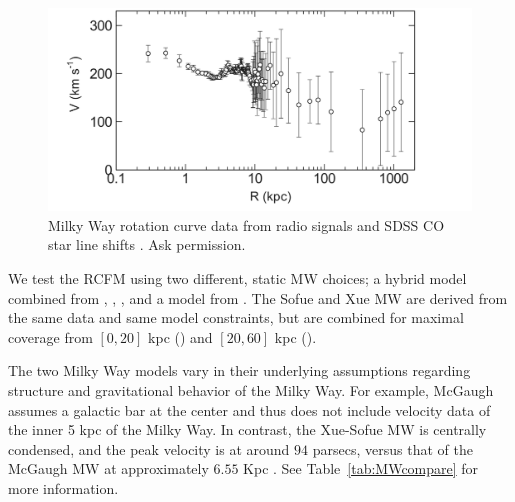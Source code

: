 \documentclass[reprint,%
 amsmath,amssymb,
 aps,
]{revtex4-1}
\begin{document}
 
 \begin{figure}
   \centering
   \includegraphics[width=\linewidth]{Sofue_MWtoLGData}
   \caption{ Milky Way rotation curve data from radio signals and SDSS CO star line shifts  \cite{Sof11}. Ask permission.}
  \label{fig:mwSofue}
\end{figure}

 We test the RCFM   using two different, static MW choices; 
   a hybrid model combined from  \citet{Xue}, 
  \citet{Sofue}, \cite{sofue2009unified}, and 
  a model from  \citet{McGaugh_2019}. The Sofue and Xue MW are derived from the same data and same model constraints, but are combined for maximal coverage from  $[0,20]$ kpc
  (\citet{Sofue})   and  $[20,60]$ kpc  (\citet{Xue}). 
  
   The  two Milky Way models vary in their underlying assumptions regarding structure and gravitational behavior of the Milky Way. For example, McGaugh \cite{McGaugh_2019} assumes a galactic bar at the center and thus does not include velocity data of the inner 5 kpc of the Milky Way.  In contrast, the Xue-Sofue MW is centrally condensed, and the peak velocity is   at around $94$ parsecs, versus that of  the McGaugh MW   at  approximately  $6.55$ Kpc   \cite{McGaugh_2019}. See Table~\ref{tab:MWcompare} for more information.
   
   
   

 
    
  
  
\end{document}
